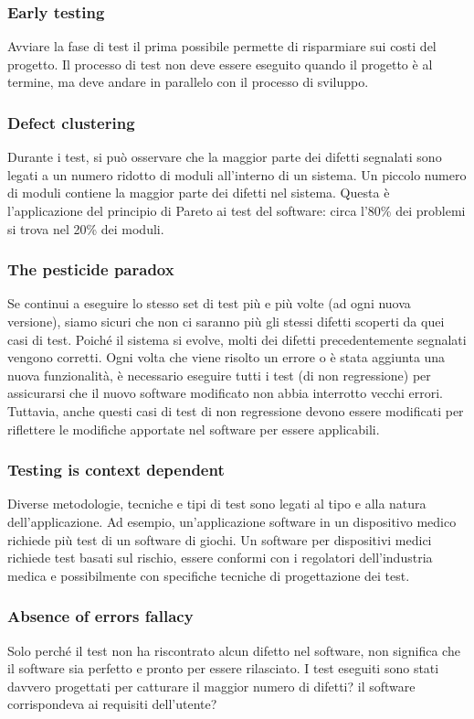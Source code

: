 \subsubsection{Early testing}
Avviare la fase di test il prima possibile permette di risparmiare sui costi del progetto.
Il processo di test non deve essere eseguito quando il progetto è al termine, ma deve andare in parallelo con il processo di sviluppo.

\subsubsection{Defect clustering}
Durante i test, si può osservare che la maggior parte dei difetti segnalati sono legati a un numero ridotto di moduli all'interno di un sistema.
Un piccolo numero di moduli contiene la maggior parte dei difetti nel sistema.
Questa è l'applicazione del principio di Pareto ai test del software: circa l'80\% dei problemi si trova nel 20\% dei moduli.

\subsubsection{The pesticide paradox}
Se continui a eseguire lo stesso set di test più e più volte (ad ogni nuova versione), siamo sicuri che non ci saranno più gli stessi difetti scoperti da quei casi di test.
Poiché il sistema si evolve, molti dei difetti precedentemente segnalati vengono corretti. Ogni volta che viene risolto un errore o è stata aggiunta una nuova funzionalità, è necessario eseguire tutti i test (di non regressione) per assicurarsi che il nuovo software modificato non abbia interrotto vecchi errori.
Tuttavia, anche questi casi di test di non regressione devono essere modificati per riflettere le modifiche apportate nel software per essere applicabili.

\subsubsection{Testing is context dependent}
Diverse metodologie, tecniche e tipi di test sono legati al tipo e alla natura dell'applicazione.
Ad esempio, un'applicazione software in un dispositivo medico richiede più test di un software di giochi.
Un software per dispositivi medici richiede test basati sul rischio, essere conformi con i regolatori dell'industria medica e possibilmente con specifiche tecniche di progettazione dei test.

\subsubsection{Absence of errors fallacy}
Solo perché il test non ha riscontrato alcun difetto nel software, non significa che il software sia perfetto e pronto per essere rilasciato.
I test eseguiti sono stati davvero progettati per catturare il maggior numero di difetti?
il software corrispondeva ai requisiti dell'utente?

